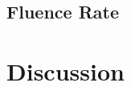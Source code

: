 \documentclass[a4paper,fleqn,usenatbib]{mnras}
\begin{document}


\subsection{Fluence Rate}
\label{sec:fluence}



\section{Discussion}
\label{sec:discuss}

\end{document}

